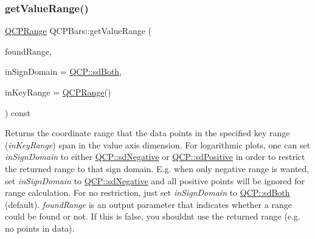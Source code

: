 \mbox{\label{class_q_c_p_bars_a02cee4bf94d48a1e5f6fc185d9a10477}} 
\subsubsection{\texorpdfstring{get\+Value\+Range()}{getValueRange()}}
{\footnotesize\ttfamily \hyperlink{class_q_c_p_range}{Q\+C\+P\+Range} Q\+C\+P\+Bars\+::get\+Value\+Range (\begin{DoxyParamCaption}\item[{bool \&}]{found\+Range,  }\item[{\hyperlink{namespace_q_c_p_afd50e7cf431af385614987d8553ff8a9}{Q\+C\+P\+::\+Sign\+Domain}}]{in\+Sign\+Domain = {\ttfamily \hyperlink{namespace_q_c_p_afd50e7cf431af385614987d8553ff8a9aa38352ef02d51ddfa4399d9551566e24}{Q\+C\+P\+::sd\+Both}},  }\item[{const \hyperlink{class_q_c_p_range}{Q\+C\+P\+Range} \&}]{in\+Key\+Range = {\ttfamily \hyperlink{class_q_c_p_range}{Q\+C\+P\+Range}()} }\end{DoxyParamCaption}) const\hspace{0.3cm}{\ttfamily [virtual]}}

Returns the coordinate range that the data points in the specified key range ({\itshape in\+Key\+Range}) span in the value axis dimension. For logarithmic plots, one can set {\itshape in\+Sign\+Domain} to either \hyperlink{namespace_q_c_p_afd50e7cf431af385614987d8553ff8a9a2d18af0bc58f6528d1e82ce699fe4829}{Q\+C\+P\+::sd\+Negative} or \hyperlink{namespace_q_c_p_afd50e7cf431af385614987d8553ff8a9a584784b75fb816abcc627cf743bb699f}{Q\+C\+P\+::sd\+Positive} in order to restrict the returned range to that sign domain. E.\+g. when only negative range is wanted, set {\itshape in\+Sign\+Domain} to \hyperlink{namespace_q_c_p_afd50e7cf431af385614987d8553ff8a9a2d18af0bc58f6528d1e82ce699fe4829}{Q\+C\+P\+::sd\+Negative} and all positive points will be ignored for range calculation. For no restriction, just set {\itshape in\+Sign\+Domain} to \hyperlink{namespace_q_c_p_afd50e7cf431af385614987d8553ff8a9aa38352ef02d51ddfa4399d9551566e24}{Q\+C\+P\+::sd\+Both} (default). {\itshape found\+Range} is an output parameter that indicates whether a range could be found or not. If this is false, you shouldn\textquotesingle{}t use the returned range (e.\+g. no points in data).

